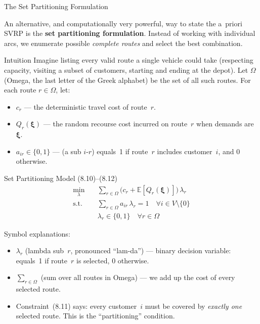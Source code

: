 \documentclass[aspectratio=169,10pt]{beamer}
\begin{document}
\begin{frame}[allowframebreaks]{The Set Partitioning Formulation}

  An alternative, and computationally very powerful, way to state the
  a~priori SVRP is the \textbf{set partitioning formulation}.
  Instead of working with individual arcs, we enumerate possible
  \emph{complete routes} and select the best combination.

  \begin{block}{Intuition}
    Imagine listing every valid route a single vehicle could take
    (respecting capacity, visiting a subset of customers, starting and
    ending at the depot).
    Let $\Omega$ (Omega, the last letter of the Greek alphabet) be the
    set of all such routes.
    For each route $r \in \Omega$, let:
    \begin{itemize}
      \item $c_r$ --- the deterministic travel cost of route~$r$.
      \item $Q_r(\boldsymbol{\xi})$ --- the random recourse cost incurred on
            route~$r$ when demands are~$\boldsymbol{\xi}$.
      \item $a_{ir} \in \{0,1\}$ --- (a sub $i$-$r$) equals~1 if
            route~$r$ includes customer~$i$, and 0 otherwise.
    \end{itemize}
  \end{block}

  \framebreak

  \begin{block}{Set Partitioning Model (8.10)--(8.12)}
    \begin{align}
      \min_{\lambda} \quad &
        \sum_{r \in \Omega}
          \bigl(c_r + \mathbb{E}[Q_r(\boldsymbol{\xi})]\bigr)\,\lambda_r
      \tag{8.10} \\[4pt]
      \text{s.t.} \quad &
        \sum_{r \in \Omega} a_{ir}\,\lambda_r = 1
        \quad \forall i \in V \setminus \{0\}
      \tag{8.11} \\[4pt]
      & \lambda_r \in \{0,1\}
        \quad \forall r \in \Omega
      \tag{8.12}
    \end{align}
  \end{block}

  Symbol explanations:
  \begin{itemize}
    \item $\lambda_r$ (lambda sub~$r$, pronounced ``lam-da'') --- binary
          decision variable: equals~1 if route~$r$ is selected, 0 otherwise.
    \item $\sum_{r \in \Omega}$ (sum over all routes in Omega) --- we add
          up the cost of every selected route.
    \item Constraint~(8.11) says: every customer~$i$ must be covered by
          \emph{exactly one} selected route.  This is the ``partitioning''
          condition.
  \end{itemize}


\end{frame}
\end{document}
